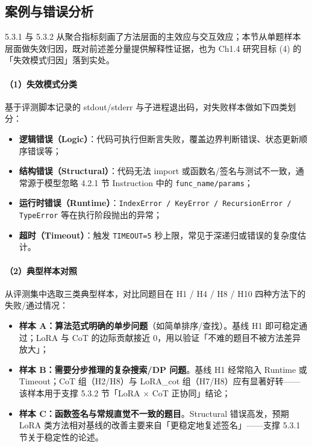 \subsection{案例与错误分析}

5.3.1 与 5.3.2 从聚合指标刻画了方法层面的主效应与交互效应；本节从单题样本层面做失效归因，既对前述差分量提供解释性证据，也为 Ch1.4 研究目标 (4) 的「失效模式归因」落到实处。

\paragraph{（1）失效模式分类}
基于评测脚本记录的 stdout/stderr 与子进程退出码，对失败样本做如下四类划分：
\begin{itemize}
    \item \textbf{逻辑错误（Logic）}：代码可执行但断言失败，覆盖边界判断错误、状态更新顺序错误等；
    \item \textbf{结构错误（Structural）}：代码无法 import 或函数名/签名与测试不一致，通常源于模型忽略 4.2.1 节 Instruction 中的 \texttt{func\_name/params}；
    \item \textbf{运行时错误（Runtime）}：\texttt{IndexError / KeyError / RecursionError / TypeError} 等在执行阶段抛出的异常；
    \item \textbf{超时（Timeout）}：触发 \texttt{TIMEOUT=5} 秒上限，常见于深递归或错误的复杂度估计。
\end{itemize}

\paragraph{（2）典型样本对照}
从评测集中选取三类典型样本，对比同题目在 H1 / H4 / H8 / H10 四种方法下的失败/通过情况：
\begin{itemize}
    \item \textbf{样本 A：算法范式明确的单步问题}（如简单排序/查找）。基线 H1 即可稳定通过；LoRA 与 CoT 的边际贡献接近 0，用以验证「不难的题目不被方法差异放大」；
    \item \textbf{样本 B：需要分步推理的复杂搜索/DP 问题}。基线 H1 经常陷入 Runtime 或 Timeout；CoT 组（H2/H8）与 LoRA\_cot 组（H7/H8）应有显著好转——该样本用于支撑 5.3.2 节「LoRA $\times$ CoT 正协同」结论；
    \item \textbf{样本 C：函数签名与常规直觉不一致的题目}。Structural 错误高发，预期 LoRA 类方法相对基线的改善主要来自「更稳定地复述签名」——支撑 5.3.1 节关于稳定性的论述。
\end{itemize}

